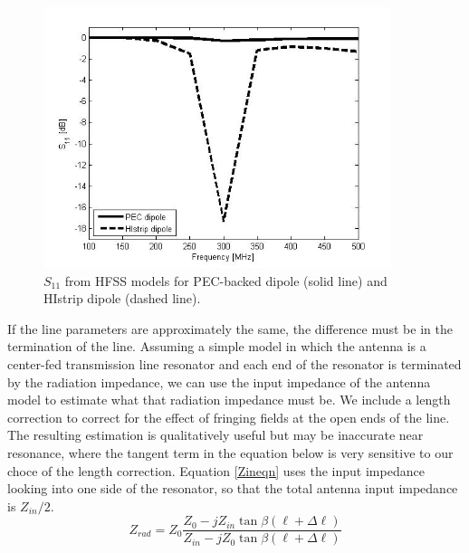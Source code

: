 \documentclass{allertonproc}
\begin{document}
\begin{figure}[htbp]
\begin{center}
\includegraphics[width=4in]{dipoleS11graph}
\caption{$S_{11}$ from HFSS models for PEC-backed dipole (solid line) and HIstrip dipole (dashed line).}
\label{dipoleS11graph}
\end{center}
\end{figure}

If the line parameters are approximately the same, the difference must be in the termination of the line.  Assuming a simple model in which the antenna is a center-fed transmission line resonator and each end of the resonator is terminated by the radiation impedance, we can use the input impedance of the antenna model to estimate what that radiation impedance must be.  We include a length correction \cite{kirschning} to correct for the effect of fringing fields at the open ends of the line.  The resulting estimation is qualitatively useful but may be inaccurate near resonance, where the tangent term in the equation below is very sensitive to our choce of the length correction. Equation \ref{Zineqn} uses the input impedance looking into one side of the resonator, so that the total antenna input impedance is $Z_{in}/2$.
\begin{equation}\label{Zineqn}
Z_{rad} = Z_0\frac{Z_0-jZ_{in}\tan\beta(\ell+\Delta\ell)}{Z_{in}-jZ_0\tan\beta(\ell+\Delta\ell)}
\end{equation}
\end{document}
